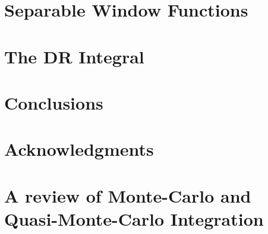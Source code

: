 \documentclass[usenatbib]{mn2e}
\begin{document}
\section{Separable Window Functions}
\label{sec:sep}

\section{The DR Integral}
\label{sec:DR}

\section{Conclusions}
\label{sec:conclude}


\section{Acknowledgments}

\appendix

\section{A review of Monte-Carlo and Quasi-Monte-Carlo Integration}
\label{sec:review}
\end{document}
